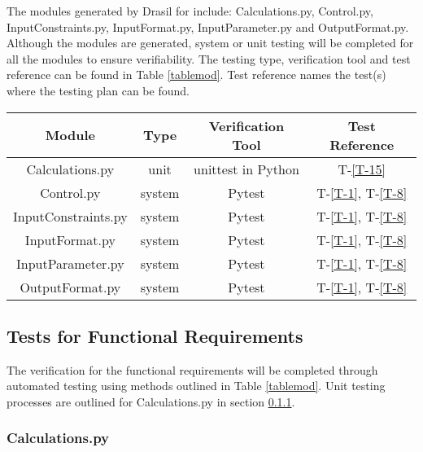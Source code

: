 \documentclass[12pt, titlepage]{article}
\newcommand{\tinref}[1]{T-\ref{#1}}
\begin{document}
The modules generated by Drasil for \progname{} include: Calculations.py, 
Control.py, InputConstraints.py, InputFormat.py, InputParameter.py and 
OutputFormat.py. Although the modules are generated, system or unit testing will 
be completed for all the modules to ensure verifiability. The testing type, 
verification tool and test reference can be found in Table \ref{tablemod}. Test 
reference names the test(s) where the testing plan can be found.

\begin{center}
 \begin{tabular}{||c|c|c|c||} 
 \hline
 Module & Type & Verification Tool & Test Reference \\ [0.5ex] 
 \hline
  Calculations.py & unit & unittest in Python & \tinref{T-15}\\
  \hline
  Control.py & system & Pytest & \tinref{T-1}, \tinref{T-8}\\
  \hline
  InputConstraints.py & system & Pytest & \tinref{T-1}, \tinref{T-8}\\
  \hline
  InputFormat.py & system & Pytest & \tinref{T-1}, \tinref{T-8}\\
  \hline
  InputParameter.py & system & Pytest & \tinref{T-1}, \tinref{T-8}\\
  \hline
  OutputFormat.py & system & Pytest & \tinref{T-1}, \tinref{T-8}\\
 \hline
\end{tabular}
\label{tablemod}

\end{center}	


\subsection{Tests for Functional Requirements}\label{utnfr}

The verification for the functional requirements will be completed through 
automated testing using methods outlined in Table \ref{tablemod}. Unit testing 
processes are outlined for Calculations.py in section \ref{modcalc}.

\subsubsection{Calculations.py}\label{modcalc}
\end{document}
